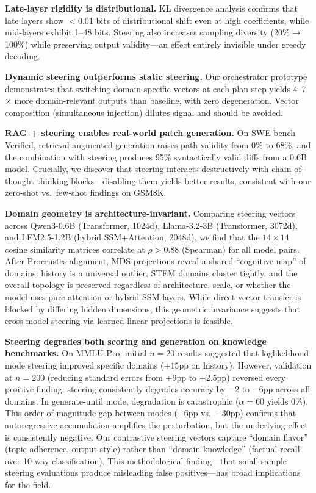 \documentclass[11pt,a4paper]{article}
\begin{document}
\textbf{Late-layer rigidity is distributional.} KL divergence analysis confirms that late layers show $<$0.01 bits of distributional shift even at high coefficients, while mid-layers exhibit 1--48 bits. Steering also increases sampling diversity (20\%$\to$100\%) while preserving output validity---an effect entirely invisible under greedy decoding.

\textbf{Dynamic steering outperforms static steering.} Our orchestrator prototype demonstrates that switching domain-specific vectors at each plan step yields 4--7$\times$ more domain-relevant outputs than baseline, with zero degeneration. Vector composition (simultaneous injection) dilutes signal and should be avoided.

\textbf{RAG + steering enables real-world patch generation.} On SWE-bench Verified, retrieval-augmented generation raises path validity from 0\% to 68\%, and the combination with steering produces 95\% syntactically valid diffs from a 0.6B model. Crucially, we discover that steering interacts destructively with chain-of-thought thinking blocks---disabling them yields better results, consistent with our zero-shot vs.\ few-shot findings on GSM8K.

\textbf{Domain geometry is architecture-invariant.} Comparing steering vectors across Qwen3-0.6B (Transformer, 1024d), Llama-3.2-3B (Transformer, 3072d), and LFM2.5-1.2B (hybrid SSM+Attention, 2048d), we find that the $14 \times 14$ cosine similarity matrices correlate at $\rho > 0.88$ (Spearman) for all model pairs. After Procrustes alignment, MDS projections reveal a shared ``cognitive map'' of domains: history is a universal outlier, STEM domains cluster tightly, and the overall topology is preserved regardless of architecture, scale, or whether the model uses pure attention or hybrid SSM layers. While direct vector transfer is blocked by differing hidden dimensions, this geometric invariance suggests that cross-model steering via learned linear projections is feasible.

\textbf{Steering degrades both scoring and generation on knowledge benchmarks.} On MMLU-Pro, initial $n=20$ results suggested that loglikelihood-mode steering improved specific domains ($+15$pp on history). However, validation at $n=200$ (reducing standard errors from $\pm$9pp to $\pm$2.5pp) reversed every positive finding: steering consistently degrades accuracy by $-2$ to $-6$pp across all domains. In generate-until mode, degradation is catastrophic ($\alpha=60$ yields 0\%). This order-of-magnitude gap between modes ($-6$pp vs.\ $-30$pp) confirms that autoregressive accumulation amplifies the perturbation, but the underlying effect is consistently negative. Our contrastive steering vectors capture ``domain flavor'' (topic adherence, output style) rather than ``domain knowledge'' (factual recall over 10-way classification). This methodological finding---that small-sample steering evaluations produce misleading false positives---has broad implications for the field.
\end{document}
